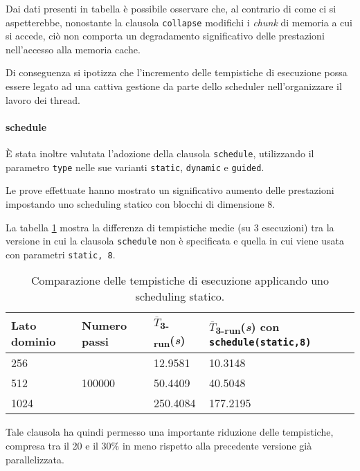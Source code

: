 
Dai dati presenti in tabella è possibile osservare che, al contrario di come ci
si aspetterebbe, nonostante la clausola \texttt{collapse} modifichi i
\textit{chunk} di memoria a cui si accede, ciò non comporta un degradamento
significativo delle prestazioni nell'accesso alla memoria cache.

Di conseguenza si ipotizza che l'incremento delle tempistiche di esecuzione
possa essere legato ad una cattiva gestione da parte dello scheduler
nell'organizzare il lavoro dei thread.

\paragraph{schedule}

È stata inoltre valutata l'adozione della clausola \texttt{schedule},
utilizzando il parametro \texttt{type} nelle sue varianti \texttt{static},
\texttt{dynamic} e \texttt{guided}.

Le prove effettuate hanno mostrato un significativo aumento delle prestazioni
impostando uno scheduling statico con blocchi di dimensione 8.

La tabella \ref{tab:schedule} mostra la differenza di tempistiche medie (su 3
esecuzioni) tra la versione in cui la clausola \texttt{schedule} non è
specificata e quella in cui viene usata con parametri \texttt{static, 8}.

\begin{table}[ht]
\centering
\begin{tabularx}{400pt}{XXXX}
\toprule
Lato dominio & Numero passi & $\overline{T}$\textsubscript{3-run}(\textit{s})&
$\overline{T}$\textsubscript{3-run}(\textit{s}) con \texttt{schedule(static,8)}\\
\midrule
 256 & \multirow{3}{*}{100000} & 12.9581 & 10.3148 \\
 512 && 50.4409 & 40.5048 \\
 1024 && 250.4084 & 177.2195 \\
\bottomrule
\end{tabularx}
\caption{\label{tab:schedule}Comparazione delle tempistiche di esecuzione
applicando uno scheduling statico.}
\end{table}

Tale clausola ha quindi permesso una importante riduzione delle tempistiche,
compresa tra il 20 e il 30\% in meno rispetto alla precedente versione già
parallelizzata.

